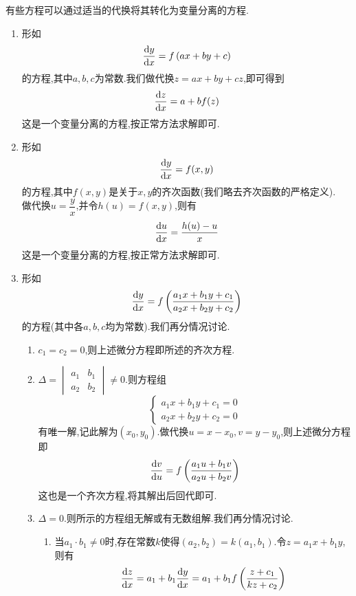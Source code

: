 \documentclass{ctexart}
\begin{document}
\begin{theorem}[2.2 可化为变量分离的方程的几类方程]
    有些方程可以通过适当的代换将其转化为变量分离的方程.
    \begin{enumerate}[label=\tbf{\arabic*.}]
        \item 形如
            \[\dfrac{\mathrm{d} y}{\mathrm{d} x}=f\left(ax+by+c\right)\]
            的方程,其中$a,b,c$为常数.我们做代换$z=ax+by+cz$,即可得到
            \[\dfrac{\mathrm{d} z}{\mathrm{d} x}=a+bf(z)\]
            这是一个变量分离的方程,按正常方法求解即可.
        \item 形如
            \[\dfrac{\mathrm{d} y}{\mathrm{d} x}=f(x,y)\]
            的方程,其中$f(x,y)$是关于$x,y$的齐次函数(我们略去齐次函数的严格定义).\\
            做代换$u=\dfrac yx$,并令$h(u)=f(x,y)$,则有
            \[\dfrac{\mathrm{d} u}{\mathrm{d} x}=\dfrac{h(u)-u}{x}\]
            这是一个变量分离的方程,按正常方法求解即可.
        \item 形如
            \[\dfrac{\mathrm{d} y}{\mathrm{d} x}=f\left(\dfrac{a_1x+b_1y+c_1}{a_2x+b_2y+c_2}\right)\]
            的方程(其中各$a,b,c$均为常数).我们再分情况讨论.
            \begin{enumerate}[label=\tbf{\alph*.}]
                \item $c_1=c_2=0$,则上述微分方程即所述的齐次方程.
                \item $\Delta=\begin{vmatrix}
                        a_1&b_1\\a_2&b_2
                    \end{vmatrix}\neq0$.则方程组
                    \[\left\{\begin{array}{l}
                        a_1x+b_1y+c_1=0\\a_2x+b_2y+c_2=0
                    \end{array}\right.\]
                    有唯一解,记此解为$\left(x_0,y_0\right)$.做代换$u=x-x_0,v=y-y_0$,则上述微分方程即
                    \[\dfrac{\mathrm{d} v}{\mathrm{d} u}=f\left(\dfrac{a_1u+b_1v}{a_2u+b_2v}\right)\]
                    这也是一个齐次方程,将其解出后回代即可.
                \item $\Delta=0$.则所示的方程组无解或有无数组解.我们再分情况讨论.
                    \begin{enumerate}[label=\tbf{\roman*.}]
                        \item 当$a_1\cdot b_1\neq0$时,存在常数$k$使得$\left(a_2,b_2\right)=k\left(a_1,b_1\right)$.令$z=a_1x+b_1y$,则有
                            \[\dfrac{\mathrm{d} z}{\mathrm{d} x}=a_1+b_1\dfrac{\mathrm{d} y}{\mathrm{d} x}=a_1+b_1f\left(\dfrac{z+c_1}{kz+c_2}\right)\]

\end{enumerate}
\end{enumerate}
\end{enumerate}
\end{theorem}
\end{document}
